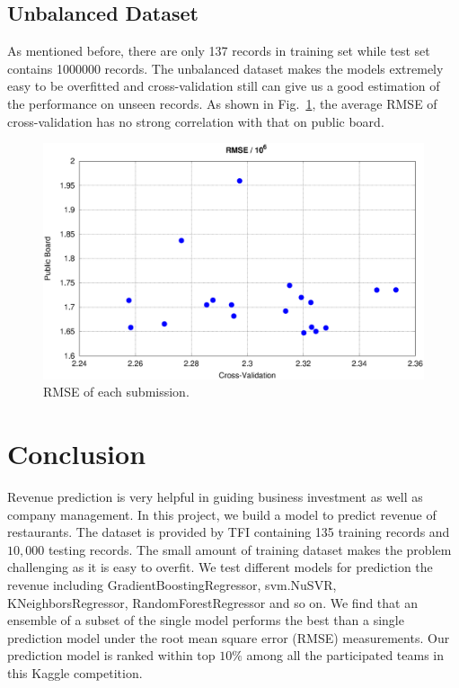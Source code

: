 \documentclass[10pt, oneside]{article}   	%
\newcommand\figref{Fig.~\ref}
\begin{document}
 
\subsection{Unbalanced Dataset}
As mentioned before, there are only 137 records in training set while test set contains 1000000 records.
The unbalanced dataset makes the models extremely easy to be overfitted and cross-validation still can give us a good estimation of the performance on unseen records.
As shown in \figref{fig:cv_lb_error}, the average RMSE of cross-validation has no strong correlation with that on public board.

\begin{figure}[htbp] %
   \centering
   \includegraphics[width=5in]{figs/cv_pb_scores.eps} 
   \caption{RMSE of each submission.}
   \label{fig:cv_lb_error}
\end{figure}


\section{Conclusion} 
Revenue prediction is very helpful in guiding business investment as well as company management. In this project, we build a model to predict revenue of restaurants. The dataset is provided by TFI containing 135 training records and $10,000$ testing records. The small amount of training dataset makes the problem challenging as it is easy to overfit. We test different models for prediction the revenue including GradientBoostingRegressor, svm.NuSVR, KNeighborsRegressor, RandomForestRegressor and so on. We find that an ensemble of a subset of the single model performs the best than a single prediction model under the root mean square error (RMSE) measurements. Our prediction model is ranked within top $10\%$ among all the participated teams in this Kaggle competition.
\end{document}
